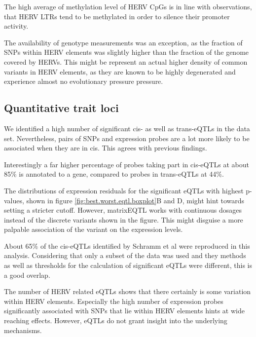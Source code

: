 \documentclass[a4paper,12pt,twoside,openright]{article}
\begin{document}
The high average of methylation level of HERV CpGs is in line with observations, that HERV LTRs tend to be methylated in order to silence their promoter activity\cite{Smith2013}.

The availability of genotype measurements was an exception, as the fraction of SNPs within HERV elements was slightly higher than the fraction of the genome covered by HERVs. This might be represent an actual higher density of common variants in HERV elements, as they are known to be highly degenerated and experience almost no evolutionary pressure pressure\cite{10.1146/annurev.genom.7.080505.115700}.

\subsection{Quantitative trait loci}
\label{Discussion:Quantitative trait loci}
We identified a high number of significant cis- as well as trans-eQTLs in the data set. Nevertheless, pairs of SNPs and expression probes are a lot more likely to be associated when they are in cis. This agrees with previous findings\cite{Joehanes2017}.

Interestingly a far higher percentage of probes taking part in cis-eQTLs at about 85\% is annotated to a gene, compared to probes in trans-eQTLs at 44\%. %
 
The distributions of expression residuals for the significant eQTLs with highest p-values, shown in figure \ref{fig:best.worst.eqtl.boxplot}B and D, might hint towards setting a stricter cutoff. However, matrixEQTL works with continuous dosages instead of the discrete variants shown in the figure. This might disguise a more palpable association of the variant on the expression levels.

About 65\% of the cis-eQTLs identified by Schramm et al\cite{Schramm2014} were reproduced in this analysis. Considering that only a subset of the data was used and they methods as well as thresholds for the calculation of significant eQTLs were different, this is a good overlap. 

The number of HERV related eQTLs shows that there certainly is some variation within HERV elements. Especially the high number of expression probes significantly associated with SNPs that lie within HERV elements hints at wide reaching effects. However, eQTLs do not grant insight into the underlying mechanisms. 
\end{document}
